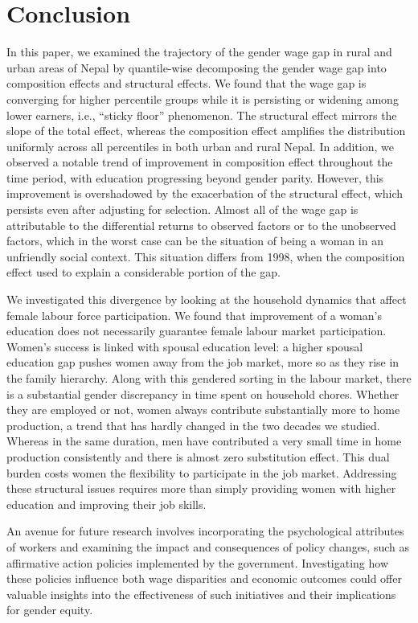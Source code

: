 \section{Conclusion} \label{isect5}

In this paper, we examined the trajectory of the gender wage gap in rural and urban areas of Nepal by quantile-wise decomposing the gender wage gap into composition effects and structural effects. We found that the wage gap is converging for higher percentile groups while it is persisting or widening among lower earners, i.e., ``sticky floor'' phenomenon. The structural effect mirrors the slope of the total effect, whereas the composition effect amplifies the distribution uniformly across all percentiles in both urban and rural Nepal. In addition, we observed a notable trend of improvement in composition effect throughout the time period, with education progressing beyond gender parity. However, this improvement is overshadowed by the exacerbation of the structural effect, which persists even after adjusting for selection. Almost all of the wage gap is attributable to the differential returns to observed factors or to the unobserved factors, which in the worst case can be the situation of being a woman in an unfriendly social context. This situation differs from 1998, when the composition effect used to explain a considerable portion of the gap.\par

We investigated this divergence by looking at the household dynamics that affect female labour force participation. We found that improvement of a woman's education does not necessarily guarantee female labour market participation. Women's success is linked with spousal education level: a higher spousal education gap pushes women away from the job market, more so as they rise in the family hierarchy. Along with this gendered sorting in the labour market, there is a substantial gender discrepancy in time spent on household chores. Whether they are employed or not, women always contribute substantially more to home production, a trend that has hardly changed in the two decades we studied. Whereas in the same duration, men have contributed a very small time in home production consistently and there is almost zero substitution effect. This dual burden costs women the flexibility to participate in the job market. Addressing these structural issues requires more than simply providing women with higher education and improving their job skills.\par  

An avenue for future research involves incorporating the psychological attributes of workers and examining the impact and consequences of policy changes, such as affirmative action policies implemented by the government. Investigating how these policies influence both wage disparities and economic outcomes could offer valuable insights into the effectiveness of such initiatives and their implications for gender equity.\par






 
